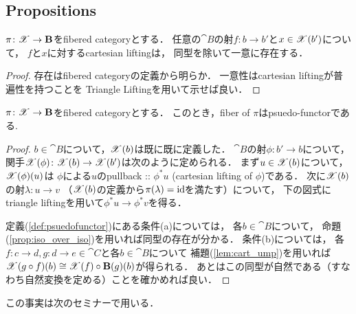 \documentclass[a4paper, dvipdfmx]{jsarticle}
\begin{document}
\subsection{Propositions}
\begin{Lemma} \label{lem:cart_ump}
    $\pi \colon \mathscr{X} \to \mathbf{B}$をfibered categoryとする．
    任意の$\cat{B}$の射$f \colon b \to b'$と$x \in \mathscr{X}(b')$について，
    $f$と$x$に対するcartesian liftingは，
    同型を除いて一意に存在する．
\end{Lemma}
\begin{proof}
    存在はfibered categoryの定義から明らか．
    一意性はcartesian liftingが普遍性を持つことを
    Triangle Liftingを用いて示せば良い．
\end{proof}

\begin{Lemma}
    $\pi \colon \mathscr{X} \to \mathbf{B}$をfibered categoryとする．
    このとき，fiber of $\pi$はpsuedo-functorである.
\end{Lemma}
\begin{proof}
    $b \in \cat{B}$について，$\mathscr{X}(b)$は既に既に定義した．
    $\cat{B}$の射$\phi \colon b' \to b$について，
    関手$\mathscr{X}(\phi) \colon \mathscr{X}(b) \to \mathscr{X}(b')$は次のように定められる．
    まず$u \in \mathscr{X}(b)$について，
    $\mathscr{X}(\phi)(u)$は
    $\phi$による$u$のpullback :: $\phi^* u$ (cartesian lifting of $\phi$)である．
    次に$\mathscr{X}(b)$の射$\lambda \colon u \to v$
    （$\mathscr{X}(b)$の定義から$\pi(\lambda)=\mathrm{id}_{\!}$を満たす）について，
    下の図式にtriangle liftingを用いて$\phi^*u \to \phi^*v$を得る．
    \begin{center}
    \end{center}

    定義(\ref{def:psuedofunctor})にある条件(a)については，
    各$b \in \cat{B}$について，
    命題(\ref{prop:iso_over_iso})を用いれば同型の存在が分かる．
    条件(b)については，
    各$f \colon c \to d, g \colon d \to e \in \cat{C}$と各$b \in \cat{B}$について
    補題(\ref{lem:cart_ump})を用いれば
    $\mathscr{X}(g \circ f)(b) \cong \mathscr{X}(f) \circ \mathbf{B}(g)(b)$が得られる．
    あとはこの同型が自然である（すなわち自然変換を定める）ことを確かめれば良い．
\end{proof}
この事実は次のセミナーで用いる．
\end{document}
